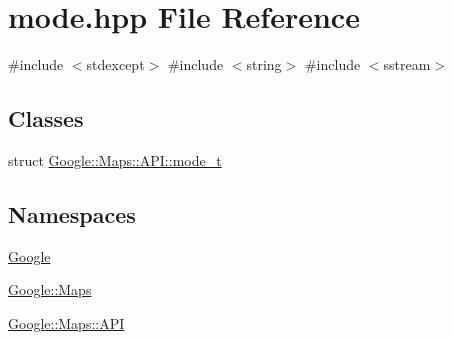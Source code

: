 \hypertarget{a00020}{}\section{mode.\+hpp File Reference}
\label{a00020}
{\ttfamily \#include $<$stdexcept$>$}\newline
{\ttfamily \#include $<$string$>$}\newline
{\ttfamily \#include $<$sstream$>$}\newline
\subsection*{Classes}
\begin{DoxyCompactItemize}
\item 
struct \hyperlink{a00044}{Google\+::\+Maps\+::\+A\+P\+I\+::mode\+\_\+t}
\end{DoxyCompactItemize}
\subsection*{Namespaces}
\begin{DoxyCompactItemize}
\item 
 \hyperlink{a00032}{Google}
\item 
 \hyperlink{a00033}{Google\+::\+Maps}
\item 
 \hyperlink{a00034}{Google\+::\+Maps\+::\+A\+PI}
\end{DoxyCompactItemize}
